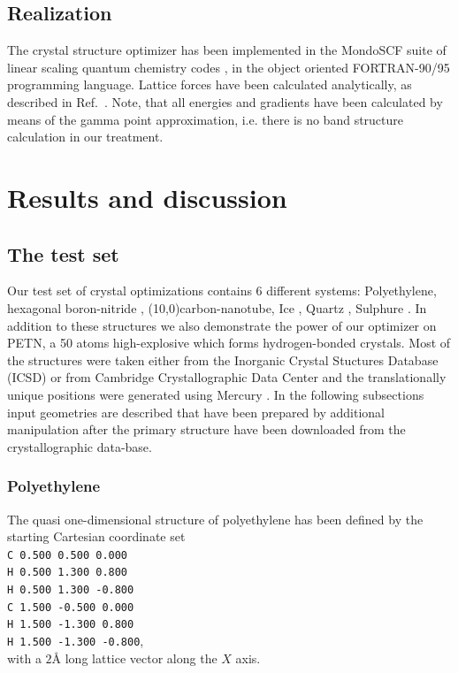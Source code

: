 \documentclass[prl,aps,preprint,superbib,12pt]{revtex4}
\begin{document}
\subsection{Realization}
The crystal structure optimizer has been implemented in the
MondoSCF suite of linear scaling quantum chemistry codes 
\cite{MondoSCF}, in the object oriented 
FORTRAN-90/95 programming language.
Lattice forces have been calculated analytically, as described in 
Ref.~\cite{CJTymczak04LatF}. Note, that all energies and gradients
have been calculated by means of the gamma point approximation,
i.e. there is no band structure calculation in our treatment.

\section{Results and discussion} \label{ResDissc}
\subsection{The test set}
Our test set of crystal optimizations contains
6 different systems:
Polyethylene, hexagonal boron-nitride , (10,0)carbon-nanotube,
Ice \cite{AGoto90}, 
Quartz \cite{MGTucker01}, 
Sulphure \cite{ACGallacher92}. 
In addition to these structures
we also demonstrate the power of our optimizer
on PETN, a 50 atoms high-explosive \cite{Trotter_1963v16,Conant_1979}
which forms hydrogen-bonded crystals.
Most of the structures were
taken either from the Inorganic Crystal Stuctures Database
(ICSD) \cite{ICSD} or from Cambridge Crystallographic Data Center
\cite{CCDC} and the translationally unique positions were
generated using Mercury \cite{Mercury}. 
In the following subsections input geometries are described that
have been prepared by additional manipulation after 
the primary structure have been downloaded
from the crystallographic data-base.  

\subsubsection{Polyethylene}
The quasi one-dimensional structure of polyethylene has been defined 
by the starting Cartesian coordinate set
\\
{\tt C    0.500   0.500   0.000} \\
{\tt H    0.500   1.300   0.800} \\
{\tt H    0.500   1.300  -0.800} \\
{\tt C    1.500  -0.500   0.000} \\
{\tt H    1.500  -1.300   0.800} \\
{\tt H    1.500  -1.300  -0.800}, \\
with a $2${\AA} long lattice vector along the $X$ axis. 
\end{document}
